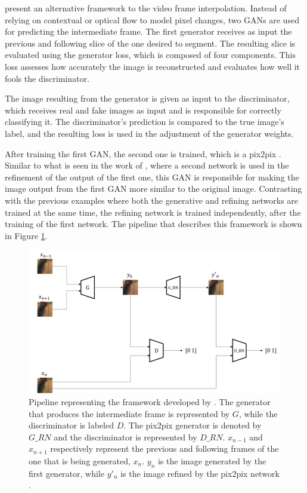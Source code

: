 \textcite{Tran2020} present an alternative framework to the video frame interpolation. Instead of relying on contextual or optical flow to model pixel changes, two GANs are used for predicting the intermediate frame. The first generator receives as input the previous and following slice of the one desired to segment. The resulting slice is evaluated using the generator loss, which is composed of four components. This loss assesses how accurately the image is reconstructed and evaluates how well it fools the discriminator.
\par
The image resulting from the generator is given as input to the discriminator, which receives real and fake images as input and is responsible for correctly classifying it. The discriminator's prediction is compared to the true image's label, and the resulting loss is used in the adjustment of the generator weights.
\par
After training the first GAN, the second one is trained, which is a pix2pix \parencite{Isola2017}. Similar to what is seen in the work of \textcite{Gambini2024, Huang2022}, where a second network is used in the refinement of the output of the first one, this GAN is responsible for making the image output from the first GAN more similar to the original image. Contrasting with the previous examples where both the generative and refining networks are trained at the same time, the refining network is trained independently, after the training of the first network. The pipeline that describes this framework is shown in Figure \ref{fig:VideoGANFramework}.

\begin{figure}[!ht]
	\centering
	\includegraphics[width=1.0\linewidth]{figures/VideoGANFramework}
	\caption{Pipeline representing the framework developed by \textcite{Tran2020}. The generator that produces the intermediate frame is represented by $G$, while the discriminator is labeled $D$. The pix2pix generator is denoted by $G\_RN$ and the discriminator is represented by $D\_RN$. $x_{n-1}$ and $x_{n+1}$ respectively represent the previous and following frames of the one that is being generated, $x_{n}$. $y_{n}$ is the image generated by the first generator, while $y'_{n}$ is the image refined by the pix2pix network \parencite{Tran2020}.}
	\label{fig:VideoGANFramework}
\end{figure}
